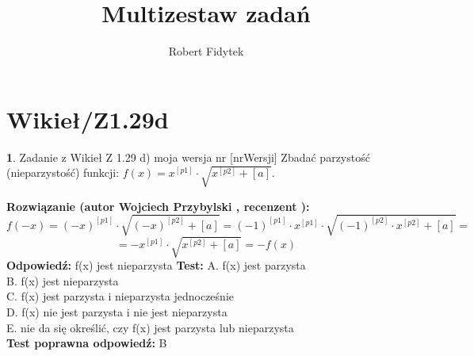 \documentclass[12pt, a4paper]{article}
\title{Multizestaw zadań}
\author{Robert Fidytek}
\date{}
\theoremstyle{definition} %
\newtheorem{zad}{}
\newcommand{\kategoria}[1]{\section{#1}} %
\newcommand{\zadStart}[1]{\begin{zad}#1\newline} %
\newcommand{\zadStop}{\end{zad}}   %
\newcommand{\rozwStart}[2]{\noindent \textbf{Rozwiązanie (autor #1 , recenzent #2): }\newline} %
\newcommand{\rozwStop}{\newline}                                            %
\newcommand{\odpStart}{\noindent \textbf{Odpowiedź:}\newline}    %
\newcommand{\odpStop}{\newline}                                             %
\newcommand{\testStart}{\noindent \textbf{Test:}\newline} %
\newcommand{\testStop}{\newline} %
\newcommand{\kluczStart}{\noindent \textbf{Test poprawna odpowiedź:}\newline} %
\newcommand{\kluczStop}{\newline} %
\begin{document}
\maketitle


\kategoria{Wikieł/Z1.29d}
\zadStart{Zadanie z Wikieł Z 1.29 d) moja wersja nr [nrWersji]}
Zbadać parzystość (nieparzystość) funkcji: $f(x)=x^{[p1]}\cdot\sqrt{x^{[p2]}+[a]} $.
\zadStop
\rozwStart{Wojciech Przybylski}{}
$$f(-x)=(-x)^{[p1]}\cdot\sqrt{(-x)^{[p2]}+[a]}=(-1)^{[p1]}\cdot x^{[p1]}\cdot\sqrt{(-1)^{[p2]}\cdot x^{[p2]}+[a]}=$$
$$=-x^{[p1]}\cdot\sqrt{x^{[p2]}+[a]}=-f(x)$$
\rozwStop
\odpStart
f(x) jest nieparzysta
\odpStop
\testStart
A. f(x) jest parzysta\\
B. f(x) jest nieparzysta\\
C. f(x) jest parzysta i nieparzysta jednocześnie\\
D. f(x) nie jest parzysta i nie jest nieparzysta\\
E. nie da się określić, czy f(x) jest parzysta lub nieparzysta\\
\testStop
\kluczStart
B
\kluczStop
\end{document}
